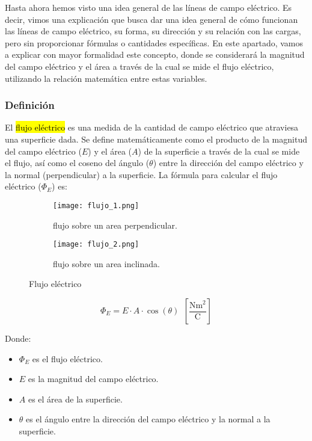 Hasta ahora hemos visto una idea general de las líneas de campo eléctrico. Es decir, vimos una explicación que busca dar una idea general de cómo funcionan las líneas de campo eléctrico, su forma, su dirección y su relación con las cargas, pero sin proporcionar fórmulas o cantidades específicas. En este apartado, vamos a explicar con mayor formalidad este concepto, donde se considerará la magnitud del campo eléctrico y el área a través de la cual se mide el flujo eléctrico, utilizando la relación matemática entre estas variables.

\subsubsection{Definición}

El \hl{flujo eléctrico} es una medida de la cantidad de campo eléctrico que atraviesa una superficie dada. Se define matemáticamente como el producto de la magnitud del campo eléctrico (\(E\)) y el área (\(A\)) de la superficie a través de la cual se mide el flujo, así como el coseno del ángulo (\(\theta\)) entre la dirección del campo eléctrico y la normal (perpendicular) a la superficie. La fórmula para calcular el flujo eléctrico (\(\Phi_E\)) es:

\begin{figure}[ht!]
    \centering
    \begin{subfigure}[b]{0.45\textwidth}
        \centering
        \texttt{[image: flujo\_1.png]}
        \caption{flujo sobre un area perpendicular.}
        \label{fig:flujo1}
    \end{subfigure}
    \hfill
    \begin{subfigure}[b]{0.45\textwidth}
        \centering
        \texttt{[image: flujo\_2.png]}
        \caption{flujo sobre un area inclinada.}
        \label{fig:flujo2}
    \end{subfigure}
    \caption{Flujo eléctrico}
    \label{fig:flujo eléctrico}
\end{figure}

\[
\Phi_E = E \cdot A \cdot \cos(\theta)  ~~ \left[\frac{\si{\newton \meter \squared}}{\si{\coulomb}}\right]
\]

Donde:
\begin{itemize}
    \item \(\Phi_E\) es el flujo eléctrico.
    \item \(E\) es la magnitud del campo eléctrico.
    \item \(A\) es el área de la superficie.
    \item \(\theta\) es el ángulo entre la dirección del campo eléctrico y la normal a la superficie.
\end{itemize}

